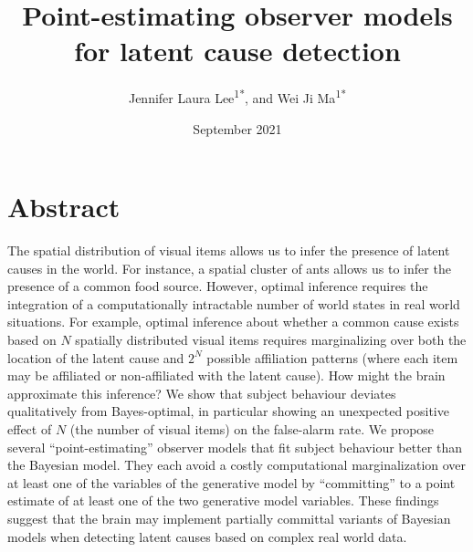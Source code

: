 \documentclass{article}
\begin{document}
\title{Point-estimating observer models for latent cause detection}
\author{Jennifer Laura Lee\textsuperscript{1*}, and Wei Ji Ma\textsuperscript{1*}}
\date{September 2021}

\maketitle

\section*{Abstract}
The spatial distribution of visual items allows us to infer the presence of latent causes in the world. For instance, a spatial cluster of ants allows us to infer the presence of a common food source. However, optimal inference requires the integration of a computationally intractable number of world states in real world situations. For example, optimal inference about whether a common cause exists based on $N$ spatially distributed visual items requires marginalizing over both the location of the latent cause and $2^N$ possible affiliation patterns (where each item may be affiliated or non-affiliated with the latent cause). How might the brain approximate this inference? We show that subject behaviour deviates qualitatively from Bayes-optimal, in particular showing an unexpected positive effect of $N$ (the number of visual items) on the false-alarm rate. We propose several ``point-estimating'' observer models that fit subject behaviour better than the Bayesian model. They each avoid a costly computational marginalization over at least one of the variables of the generative model by ``committing'' to a point estimate of at least one of the two generative model variables. These findings suggest that the brain may implement partially committal variants of Bayesian models when detecting latent causes based on complex real world data.

\end{document}

